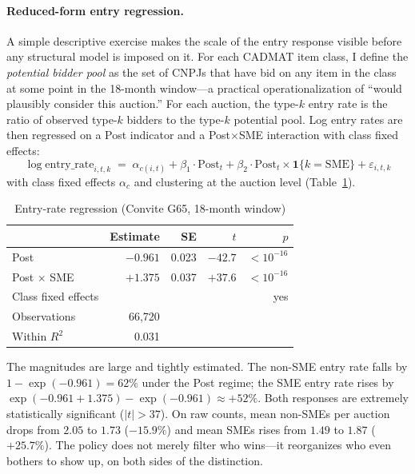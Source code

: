 \documentclass[12pt]{article}
\begin{document}
\paragraph{Reduced-form entry regression.}
A simple descriptive exercise makes the scale of the entry
response visible before any structural model is imposed on it.
For each CADMAT item class, I define the \emph{potential bidder
pool} as the set of CNPJs that have bid on any item in the class
at some point in the 18-month window---a practical operationalization
of ``would plausibly consider this auction.'' For each auction,
the type-$k$ entry rate is the ratio of observed type-$k$ bidders
to the type-$k$ potential pool. Log entry rates are then
regressed on a Post indicator and a Post$\times$SME interaction
with class fixed effects:
\[
\log \text{entry\_rate}_{i,t,k}
 \;=\; \alpha_{c(i,t)}
    + \beta_1 \cdot \text{Post}_t
    + \beta_2 \cdot \text{Post}_t \times \mathbf{1}\{k = \text{SME}\}
    + \varepsilon_{i,t,k}
\]
with class fixed effects $\alpha_c$ and clustering at the auction
level (Table~\ref{tab:entry-reg}).

\begin{table}[htbp]
\centering
\caption{Entry-rate regression (Convite G65, 18-month window)}
\label{tab:entry-reg}
\small
\begin{tabular}{lrrrr}
\toprule
                     & Estimate & SE    & $t$     & $p$ \\
\midrule
Post                 & $-0.961$ & 0.023 & $-42.7$ & $<10^{-16}$ \\
Post $\times$ SME    & $+1.375$ & 0.037 & $+37.6$ & $<10^{-16}$ \\
Class fixed effects  &          &       &         & yes \\
Observations         & 66{,}720 &       &         & \\
Within $R^2$         & 0.031    &       &         & \\
\bottomrule
\end{tabular}
\end{table}

The magnitudes are large and tightly estimated. The non-SME
entry rate falls by $1 - \exp(-0.961) = 62\%$ under the Post
regime; the SME entry rate rises by $\exp(-0.961 + 1.375) -
\exp(-0.961) \approx +52\%$. Both responses are extremely
statistically significant ($|t| > 37$). On raw counts, mean
non-SMEs per auction drops from $2.05$ to $1.73$ ($-15.9\%$) and
mean SMEs rises from $1.49$ to $1.87$ ($+25.7\%$). The policy
does not merely filter who wins---it reorganizes who even bothers
to show up, on both sides of the distinction.
\end{document}
